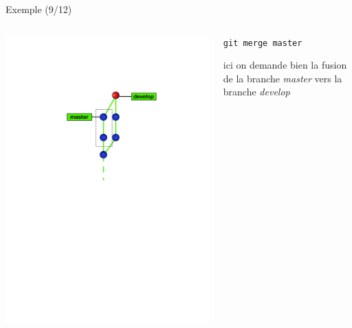 \begin{frame}[fragile]{%
\protect\hypertarget{exemple-912}{%
Exemple (9/12)}}

\begin{columns}[T]
\begin{column}{0.40\textwidth}
\includegraphics[width=1\textwidth]{images/branch9.pdf}
\end{column}

\begin{column}{0.60\textwidth}
\texttt{git\ merge\ master}

ici on demande bien la fusion de la branche \emph{master} vers la
branche \emph{develop}
\end{column}
\end{columns}

\end{frame}

